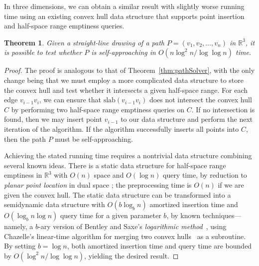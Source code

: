 \documentclass[11pt]{article}
\newcommand{\perpslab}[1]{\mathrm{slab}(#1)}
\newtheorem{theorem}{Theorem}
\begin{document}
In three dimensions, we can obtain a similar result with slightly worse running time using an existing convex hull data structure that supports point insertion and half-space range emptiness queries.
\begin{theorem}
\label{thm:pathSolver3D}
Given a straight-line drawing of a path $P=(v_1,v_2,\ldots,v_n)$ in $\mathbb{R}^3$, it is possible to test whether $P$ is self-approaching in $O(n \log^2 n/\log\log n)$ time.
\end{theorem}
\begin{proof}
The proof is analogous to that of Theorem~\ref{thm:pathSolver}, with the only change being that we must employ a more complicated data structure to store the convex hull and test whether it intersects a given half-space range.  For each edge $v_{i-1}v_i$, we can ensure that $\perpslab{v_{i-1}v_i}$ does not intersect the convex hull $C$ by performing two half-space range emptiness queries on $C$.  If no intersection is found, then we may insert point $v_{i-1}$ to our data structure and perform the next iteration of the algorithm.  If the algorithm successfully inserts all points into $C$, then the path $P$ must be self-approaching.

Achieving the stated running time requires a nontrivial data structure combining several known ideas.  There is a static data structure for half-space range emptiness in $\mathbb{R}^3$ with $O(n)$ space and $O(\log n)$ query time, by reduction to {\em planar point location\/} in dual space \cite{Kir:pl}; the preprocessing time is $O(n)$ if we are given the convex hull. The static data structure can be transformed into a semidynamic data structure with $O(b\log_b n)$ amortized insertion time and $O(\log_b n\log n)$ query time for a given parameter $b$, by known techniques---namely, a $b$-ary version of Bentley and Saxe's {\em logarithmic method\/}~\cite{BenSax}, using Chazelle's linear-time algorithm for merging two convex hulls~\cite{Cha:merge} as a subroutine. By setting $b=\log n$, both amortized insertion time and query time are bounded by $O(\log^2 n/\log\log n)$, yielding the desired result.
\end{proof}
\end{document}
